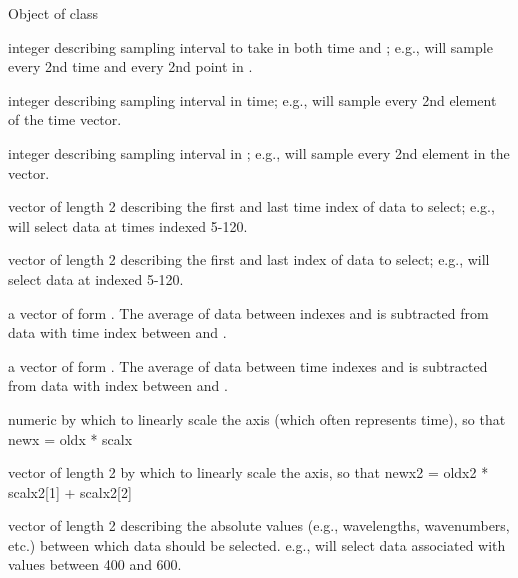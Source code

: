 \begin{Arguments}
\begin{ldescription}
\item[\code{data}] Object of class 
\item[\code{sample}] integer describing sampling interval to take in both time and 
; e.g.,  
will sample every 2nd time and every 2nd point in 
.
\item[\code{sample\_time}] integer describing sampling interval in time; e.g.,
 will sample every 2nd element of the time vector. 
\item[\code{sample\_lambda}] integer describing sampling interval in ; 
e.g.,  will sample every 2nd element in the 
 vector. 
\item[\code{sel\_time}] vector of length 2 describing the first and last time 
index of data to select; e.g.,  will select 
data at times indexed 5-120. 
\item[\code{sel\_lambda}] vector of length 2 describing the first and last   
index of data to select; e.g.,  
will select data at 
indexed 5-120. 
\item[\code{baselinetime}] a vector of form .  The average of data between 
 indexes  
 and  
is subtracted from data with 
time index between  and .  
\item[\code{baselinelambda}] a vector of form .  The average of data between time indexes  
 and  
is subtracted from data with  index 
between  and .
\item[\code{scalx}] numeric by which to linearly scale the  axis
(which often represents time), so that newx = oldx * scalx 
\item[\code{scalx2}] vector of length 2 by which to linearly scale the 
 axis, so that newx2 = oldx2 * scalx2[1] + scalx2[2]
\item[\code{sel\_lambda\_ab}] vector of length 2 describing the absolute values
(e.g., wavelengths, wavenumbers, etc.) between which data should be
selected.   e.g.,  will select data  
associated with  values between 400 and 600. 

\end{ldescription}
\end{Arguments}
